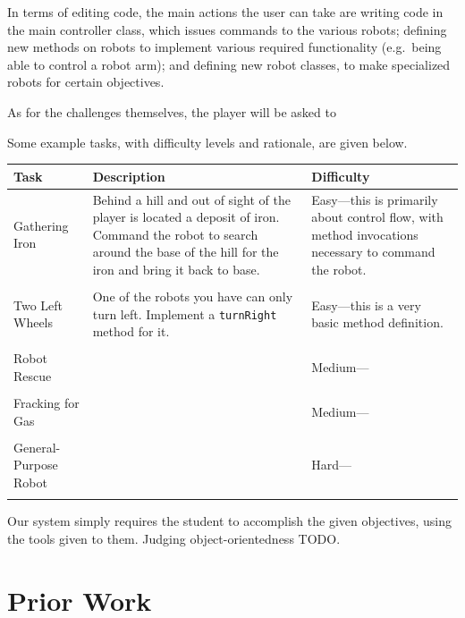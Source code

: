 \documentclass[12pt,notitlepage]{article}
\begin{document}
In terms of editing code, the main actions the user can take are
writing code in the main controller class, which issues commands to
the various robots; defining new methods on robots to implement
various required functionality (e.g.\ being able to control a robot
arm); and defining new robot classes, to make specialized robots for
certain objectives.

As for the challenges themselves, the player will be asked to

Some example tasks, with difficulty levels and rationale, are given
below.

\noindent\begin{tabu}{lXX}
  \\
\toprule
Task & Description & Difficulty \\
\midrule
Gathering Iron & Behind a hill and out of sight of the player is
located a deposit of iron. Command the robot to search around the base
of the hill for the iron and bring it back to base.& Easy---this is
primarily about control flow, with method invocations necessary to
command the robot. \\
\\
Two Left Wheels & One of the robots you have can only turn
left. Implement a \texttt{turnRight} method for it. & Easy---this is a
very basic method definition.\\ \\
Robot Rescue & & Medium--- \\ \\
Fracking for Gas & & Medium--- \\ \\
General-Purpose Robot & & Hard--- \\
\bottomrule
\\
\end{tabu}
Our system simply requires the student to accomplish the given
objectives, using the tools given to them. Judging object-orientedness
TODO.

\section{Prior Work}
\end{document}
